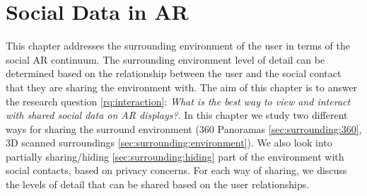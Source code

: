 \chapter{Social Data in AR} %
\label{ch:data} %

This chapter addresses the surrounding environment of the user in terms of the social AR continuum. The surrounding environment level of detail can be determined based on the relationship between the user and the social contact that they are sharing the environment with.  The aim of this chapter is to answer the research question \ref{rq:interaction}: \textit{What is the best way to view and interact with shared social data on AR displays?}. In this chapter we study two different ways for sharing the surround environment (360 Panoramas \ref{sec:surrounding:360}, 3D scanned surroundings \ref{sec:surrounding:environment}). We also look into partially sharing/hiding \ref{sec:surrounding:hiding} part of the environment with social contacts, based on privacy concerns. For each way of sharing, we discuss the levels of detail that can be shared based on the user relationships. 





